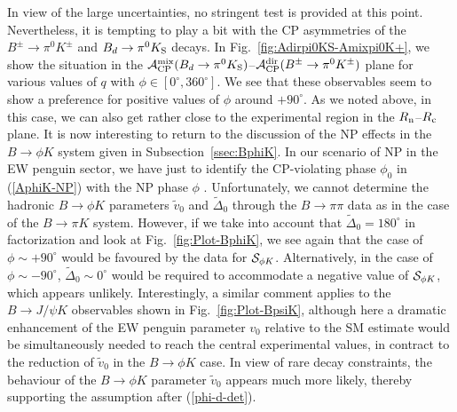 \documentclass[11pt]{cernrep}
\begin{document}
In view of the large uncertainties, no stringent test is provided at this point.
Nevertheless, it is tempting to play a bit with the CP asymmetries of the
$B^\pm\to\pi^0K^\pm$ and $B_d\to\pi^0K_{\rm S}$ decays. In 
Fig.~\ref{fig:Adirpi0KS-Amixpi0K+}, we show the situation in the 
${\cal A}_{\rm CP}^{\rm mix}(B_d\to\pi^0K_{\rm S})$--${\cal A}_{\rm CP}^{\rm dir}
(B^\pm\to\pi^0K^\pm)$ plane for various values of $q$ with $\phi\in[0^\circ,360^\circ]$.
We see that these observables seem to show a preference for positive values of 
$\phi$ around $+90^\circ$. As we noted above, in this case, we can also get 
rather close to the experimental region in the $R_{\rm n}$--$R_{\rm c}$ plane.
It is now interesting to return to the discussion of the NP effects in the
$B\to\phi K$ system given in Subsection~\ref{ssec:BphiK}. In our scenario of NP 
in the EW penguin sector, we have just to identify the CP-violating phase $\phi_0$ 
in (\ref{AphiK-NP}) with the NP phase $\phi$ \cite{BFRS3}. Unfortunately, we 
cannot determine the hadronic $B\to\phi K$ parameters $\tilde v_0$ and 
$\tilde\Delta_0$ through the $B\to\pi\pi$ data as in the case of the $B\to\pi K$ 
system. However, if we take 
into account that $\tilde\Delta_0=180^\circ$ in factorization and look at 
Fig.~\ref{fig:Plot-BphiK}, we see again that the case of $\phi\sim+90^\circ$ would 
be favoured by the data for ${\cal S}_{\phi K}$. Alternatively, in the case of 
$\phi\sim-90^\circ$, $\tilde\Delta_0\sim 0^\circ$ would be required to 
accommodate a negative value of ${\cal S}_{\phi K}$, which appears unlikely. Interestingly, a similar comment applies to the $B\to J/\psi K$ observables 
shown in Fig.~\ref{fig:Plot-BpsiK}, although here a dramatic enhancement of the 
EW penguin parameter $v_0$ relative to the SM estimate would be simultaneously
needed to reach the central experimental values, in contract to the reduction of 
$\tilde v_0$ in the $B\to\phi K$ case. In view of rare decay constraints, the behaviour 
of the $B\to \phi K$ parameter $\tilde v_0$ appears much more likely, 
thereby supporting the assumption after (\ref{phi-d-det}). 


%
%
%
\boldmath
\end{document}
